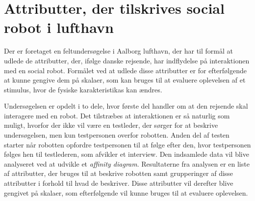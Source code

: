 \chapter*{Attributter, der tilskrives social robot i lufthavn}
%
Der er foretaget en feltundersøgelse i Aalborg lufthavn, der har til formål at udlede de attributter, der, ifølge danske rejsende, har indflydelse på interaktionen med en social robot. Formålet ved at udlede disse attributter er for efterfølgende at kunne gengive dem på skalaer, som kan bruges til at evaluere oplevelsen af et stimulus, hvor de fysiske karakteristikas kan ændres. 

Undersøgelsen er opdelt i to dele, hvor første del handler om at den rejsende skal interagere med en robot. Det tilstræbes at interaktionen er så naturlig som muligt, hvorfor der ikke vil være en testleder, der sørger for at beskrive undersøgelsen, men kun testpersonen overfor robotten. Anden del af testen starter når robotten opfordre testpersonen til at følge efter den, hvor testpersonen følges hen til testlederen, som afvikler et interview. Den indsamlede data vil blive analyseret ved at udvikle et \textit{affinity diagram}. Resultaterne fra analysen er en liste af attributter, der bruges til at beskrive robotten samt grupperinger af disse attributter i forhold til hvad de beskriver. Disse attributter vil derefter blive gengivet på skalaer, som efterfølgende vil kunne bruges til at evaluere oplevelsen.  